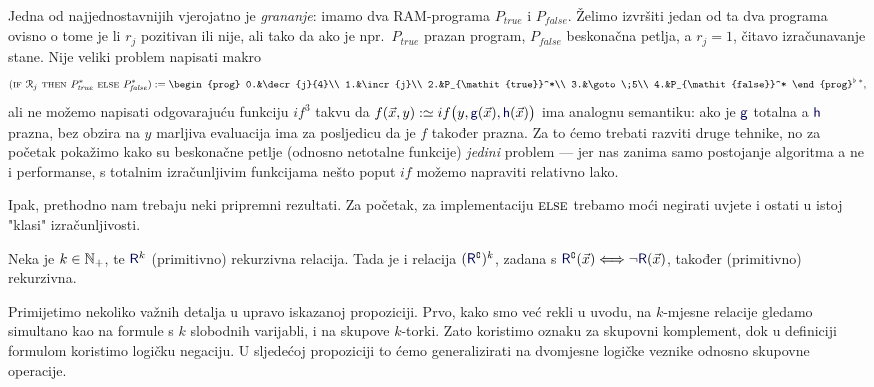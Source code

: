 Jedna od najjednostavnijih vjerojatno je \emph{grananje}: imamo dva RAM-programa $P_{\mathit{true}}$ i $P_{\mathit{false}}$. Želimo izvršiti jedan od ta dva programa ovisno o tome je li $r_j$ pozitivan ili nije, ali tako da ako je npr.\ $P_{\mathit{true}}$ prazan program, $P_{\mathit{false}}$ beskonačna petlja, a $r_j=1$, čitavo izračunavanje stane. Nije veliki problem napisati makro
\begin{equation}
    (\textsc{if $\reg{j}$ then $P_{\mathit{true}}^*$ else $P_{\mathit{false}}^*$}):=\begin{prog}
    0.&\decr{j}{4}\\
    1.&\incr{j}\\
    2.&P_{\mathit{true}}^*\\
    3.&\goto\;5\\
    4.&P_{\mathit{false}}^*
    \end{prog}^{\flat\;*}\text,
\end{equation}
ali ne možemo napisati odgovarajuću funkciju $if^3$ takvu da $f(\vec x,y):\simeq if\bigl(y,\f g(\vec x),\f h(\vec x)\bigr)$ ima analognu semantiku: ako je $\f g$ totalna a $\f h$ prazna, bez obzira na $y$ marljiva evaluacija ima za posljedicu da je $f$ također prazna. Za to ćemo trebati razviti druge tehnike, no za početak pokažimo kako su beskonačne petlje (odnosno netotalne funkcije) \emph{jedini} problem --- jer nas zanima samo postojanje algoritma a ne i performanse, s totalnim izračunljivim funkcijama nešto poput $if$ možemo napraviti relativno lako. 

Ipak, prethodno nam trebaju neki pripremni rezultati. Za početak, za implementaciju $\textsc{else}$ trebamo moći negirati uvjete i ostati u istoj "klasi" izračunljivosti.

\begin{propozicija}[{name=[komplement čuva (primitivnu) rekurzivnost]}]\label{prop:kompl}
Neka je $k\in{\mathbb N}_+$, te $\f R^k$ (primitivno) rekurzivna relacija. Tada je i relacija $(\f R\kompl)^k$, zadana s $\f R\kompl(\vec x)\Longleftrightarrow\lnot \f R(\vec x)$, također (primitivno) rekurzivna.
\end{propozicija}

Primijetimo nekoliko važnih detalja u upravo iskazanoj propoziciji. Prvo, kako smo već rekli u uvodu, na $k$-mjesne relacije gledamo simultano kao na formule s $k$ slobodnih varijabli, i na skupove $k$-torki. Zato koristimo oznaku za skupovni komplement, dok u definiciji formulom koristimo logičku negaciju. U sljedećoj propoziciji to ćemo generalizirati na dvomjesne logičke veznike odnosno skupovne operacije.

